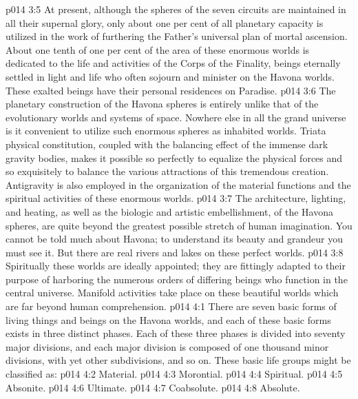\vs p014 3:5 At present, although the spheres of the seven circuits are maintained in all their supernal glory, only about one per cent of all planetary capacity is utilized in the work of furthering the Father’s universal plan of mortal ascension. About one tenth of one per cent of the area of these enormous worlds is dedicated to the life and activities of the Corps of the Finality, beings eternally settled in light and life who often sojourn and minister on the Havona worlds. These exalted beings have their personal residences on Paradise.
\vs p014 3:6 The planetary construction of the Havona spheres is entirely unlike that of the evolutionary worlds and systems of space. Nowhere else in all the grand universe is it convenient to utilize such enormous spheres as inhabited worlds. Triata physical constitution, coupled with the balancing effect of the immense dark gravity bodies, makes it possible so perfectly to equalize the physical forces and so exquisitely to balance the various attractions of this tremendous creation. Antigravity is also employed in the organization of the material functions and the spiritual activities of these enormous worlds.
\vs p014 3:7 The architecture, lighting, and heating, as well as the biologic and artistic embellishment, of the Havona spheres, are quite beyond the greatest possible stretch of human imagination. You cannot be told much about Havona; to understand its beauty and grandeur you must see it. But there are real rivers and lakes on these perfect worlds.
\vs p014 3:8 Spiritually these worlds are ideally appointed; they are fittingly adapted to their purpose of harboring the numerous orders of differing beings who function in the central universe. Manifold activities take place on these beautiful worlds which are far beyond human comprehension.
\vs p014 4:1 There are seven basic forms of living things and beings on the Havona worlds, and each of these basic forms exists in three distinct phases. Each of these three phases is divided into seventy major divisions, and each major division is composed of one thousand minor divisions, with yet other subdivisions, and so on. These basic life groups might be classified as:
\pc \vs p014 4:2 \bibnobreakspace Material.
\vs p014 4:3 \bibnobreakspace Morontial.
\vs p014 4:4 \bibnobreakspace Spiritual.
\vs p014 4:5 \bibnobreakspace Absonite.
\vs p014 4:6 \bibnobreakspace Ultimate.
\vs p014 4:7 \bibnobreakspace Coabsolute.
\vs p014 4:8 \bibnobreakspace Absolute.

